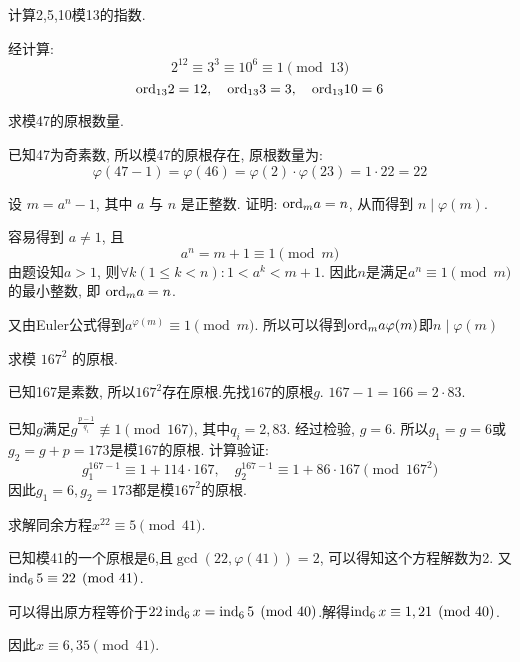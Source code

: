 \begin{problem}
    计算2,5,10模13的指数.
    \begin{answer}
        经计算:
        \[2^{12} \equiv 3^{3} \equiv 10^6 \equiv 1 \pmod{13}\]
        \[\mathrm{ord}_{13} 2=12,\quad \mathrm{ord}_{13} 3=3, \quad \mathrm{ord}_{13} 10=6\]
    \end{answer}
\end{problem}

\begin{problem}
    求模47的原根数量.
    \begin{answer}
        已知47为奇素数, 所以模47的原根存在, 原根数量为:
        \[\varphi(47-1)= \varphi(46) = \varphi(2)\cdot\varphi(23)= 1 \cdot 22 = 22\]
    \end{answer}
\end{problem}

\begin{problem}
    设 \(m = a^n - 1\), 其中 \(a\) 与 \(n\) 是正整数. 证明:
    \(\mathrm{ord}_{m} a = n\), 从而得到 \(n \mid \varphi(m)\).
\begin{answer}
    容易得到 \(a \ne 1\), 且
    \[a^n = m + 1 \equiv 1 \pmod{m}\]
    由题设知\(a > 1\), 则\(\forall k(1 \le k < n): 1 < a^k < m+1\).
    因此\(n\)是满足\(a^n \equiv1 \pmod{m}\)的最小整数, 即
    \(\mathrm{ord}_{m} a = n\).

    又由Euler公式得到\(a^{\varphi(m)} \equiv 1 \pmod{m}\).
    所以可以得到\(\mathrm{ord}_{m} a \varphi(m)\)即\(n \mid \varphi(m)\)
\end{answer}
\end{problem}

\begin{problem}
    求模 \(167^2\) 的原根.
\begin{answer}
    已知167是素数, 所以\(167^2\)存在原根.先找167的原根\(g\).
    \(167 - 1 = 166 = 2 \cdot 83\).
    
    已知\(g\)满足\(g^{\frac{p-1}{q_i}} \not\equiv 1 \pmod{167}\),
    其中\(q_i = 2, 83\). 经过检验, \(g = 6\). 所以\(g_1 = g = 6\)或\(g_2 = g + p = 173\)是模167的原根.
    计算验证:
    \[g_1^{167-1} \equiv 1 + 114 \cdot 167, \quad g_2^{167-1} \equiv 1 + 86 \cdot 167 \pmod{167^2}\]
    因此\(g_1 = 6, g_2 = 173\)都是模\(167^2\)的原根.
\end{answer}
\end{problem}

\begin{problem}
    求解同余方程\(x^{22} \equiv 5 \pmod{41}\).
\begin{answer}
    已知模41的一个原根是6,且\(\gcd(22, \varphi(41)) = 2\), 
    可以得知这个方程解数为2.
    又\(\operatorname{ind}_{6} 5 \equiv 22 \pmod{41} \).

    可以得出原方程等价于\(22\operatorname{ind}_{6} x = \operatorname{ind}_{6} 5\pmod{40}\).解得\(\operatorname{ind}_{6} x \equiv 1, 21 \pmod{40}\).
    
    因此\(x \equiv 6, 35 \pmod{41}\).
\end{answer}
\end{problem}

